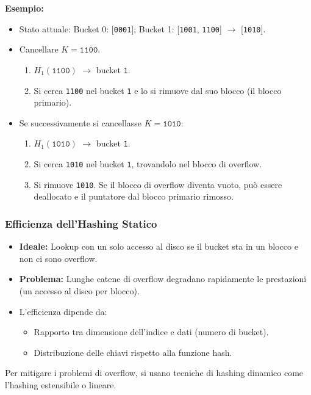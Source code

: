 \textbf{Esempio:}
\begin{itemize}
    \item Stato attuale: Bucket 0: [\texttt{0001}]; Bucket 1: [\texttt{1001}, \texttt{1100}] $\rightarrow$ [\texttt{1010}].
    \item Cancellare $K = \texttt{1100}$.
    \begin{enumerate}
        \item $H_1(\texttt{1100})$ $\rightarrow$ bucket \texttt{1}.
        \item Si cerca \texttt{1100} nel bucket \texttt{1} e lo si rimuove dal suo blocco (il blocco primario).
    \end{enumerate}
    \item Se successivamente si cancellasse $K = \texttt{1010}$:
    \begin{enumerate}
        \item $H_1(\texttt{1010})$ $\rightarrow$ bucket \texttt{1}.
        \item Si cerca \texttt{1010} nel bucket \texttt{1}, trovandolo nel blocco di overflow.
        \item Si rimuove \texttt{1010}. Se il blocco di overflow diventa vuoto, può essere deallocato e il puntatore dal blocco primario rimosso.
    \end{enumerate}
\end{itemize}

\subsubsection{Efficienza dell'Hashing Statico}
\begin{itemize}
    \item \textbf{Ideale:} Lookup con un solo accesso al disco se il bucket sta in un blocco e non ci sono overflow.
    \item \textbf{Problema:} Lunghe catene di overflow degradano rapidamente le prestazioni (un accesso al disco per blocco).
    \item L'efficienza dipende da:
    \begin{itemize}
        \item Rapporto tra dimensione dell'indice e dati (numero di bucket).
        \item Distribuzione delle chiavi rispetto alla funzione hash.
    \end{itemize}
\end{itemize}
Per mitigare i problemi di overflow, si usano tecniche di hashing dinamico come l'hashing estensibile o lineare.

